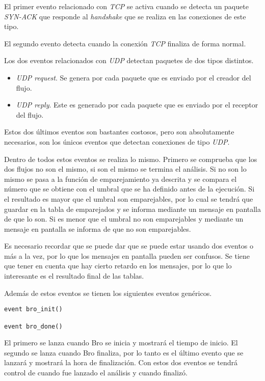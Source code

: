 \intro El primer evento relacionado con \textit{TCP} se activa cuando se detecta un paquete \textit{SYN-ACK} que 
responde al \textit{handshake} que se realiza en las conexiones de este tipo.

\intro El segundo evento detecta cuando la conexión \textit{TCP} finaliza de forma normal.

\intro Los dos eventos relacionados con \textit{UDP} detectan paquetes de dos tipos distintos.

\begin{itemize}
\item \textit{UDP request}. Se genera por cada paquete que es enviado por el creador del flujo.
\item \textit{UDP reply}. Este es generado por cada paquete que es enviado por el receptor del flujo.
\end{itemize}

\intro Estos dos últimos eventos son bastantes costosos, pero son absolutamente necesarios, son los únicos 
eventos que detectan conexiones de tipo \textit{UDP}.

\intro Dentro de todos estos eventos se realiza lo mismo. Primero se comprueba que los dos flujos no son el mismo, 
si son el mismo se termina el análisis. Si no son lo mismo se pasa a la función de emparejamiento ya descrita y 
se compara el número que se obtiene con el umbral que se ha definido antes de la ejecución. Si el resultado es 
mayor que el umbral son emparejables, por lo cual se tendrá que guardar en la tabla de emparejados y se informa 
mediante un mensaje en pantalla de que lo son. Si es menor que el umbral no son emparejables y mediante un mensaje 
en pantalla se informa de que no son emparejables.

\intro Es necesario recordar que se puede dar que se puede estar usando dos eventos o más a la vez, por lo que los 
mensajes en pantalla pueden ser confusos. Se tiene que tener en cuenta que hay cierto retardo en los mensajes, por 
lo que lo interesante es el resultado final de las tablas.

\intro Además de estos eventos se tienen los siguientes eventos genéricos.

\begin{lstlisting}[style=CodigoC]
event bro_init()

event bro_done()
\end{lstlisting}

\intro El primero se lanza cuando Bro se inicia y mostrará el tiempo de inicio. El segundo se lanza cuando 
Bro finaliza, por lo tanto es el último evento que se lanzará y mostrará la hora de finalización. Con estos 
dos eventos se tendrá control de cuando fue lanzado el análisis y cuando finalizó.

